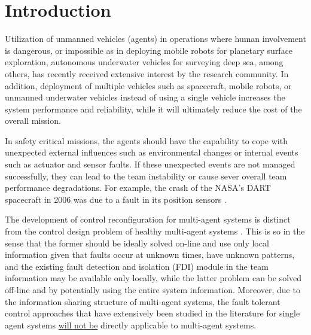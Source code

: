 \documentclass[12pt,draftcls,onecolumn]{IEEEtran}
\begin{document}
\section{Introduction}
Utilization of unmanned vehicles (agents)  in operations where human involvement is dangerous, or impossible as in deploying mobile robots for planetary surface exploration, autonomous underwater vehicles for surveying  deep sea,  among others,  has  recently received extensive interest by the research community. In addition, deployment of multiple vehicles such as spacecraft, mobile robots,  or unmanned underwater vehicles instead of using  a single vehicle increases the  system performance and reliability, while it will ultimately reduce the cost of the overall mission. \par

 In safety critical missions, the agents should have the capability to  cope with unexpected external influences such as  environmental changes  or internal events such as actuator and sensor faults. If these unexpected events are not managed successfully, they can lead to the team  instability or cause sever overall team  performance degradations. For example, the crash of the NASA's DART spacecraft in 2006 was due to a fault in its position sensors  \cite{croomes2006}.\par 
 
The development of control reconfiguration for multi-agent systems is distinct from the control design problem of healthy multi-agent systems \cite{breger2008,Semsar2009,Ren2010a,Movric2014}. This is so in the sense that the former should be ideally solved on-line and use only local information given that faults  occur at unknown times, have unknown patterns,  and the existing fault detection and isolation (FDI) module in the team information may  be available only locally, while the latter problem can be solved  off-line and by potentially using the entire system  information. Moreover,  due to the  information sharing structure of multi-agent systems,  the fault tolerant control approaches that have extensively been studied in the literature for single agent systems  \cite{Yang2010,Wang2010,Liu2012,Xavier2012,Khosrowjerdi2004} \underline{will not be} directly applicable to multi-agent systems.\par
\end{document}
